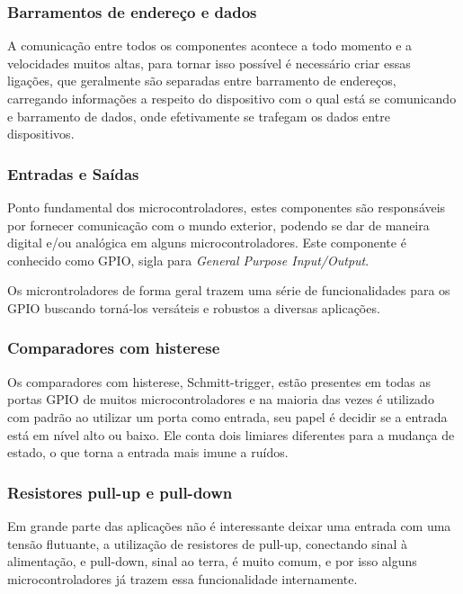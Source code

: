 \subsubsection*{Barramentos de endereço e dados}

A comunicação entre todos os componentes acontece a todo momento e a velocidades muitos altas, para tornar isso possível é necessário criar essas ligações, que geralmente são separadas entre barramento de endereços, carregando informações a respeito do dispositivo com o qual está se comunicando e barramento de dados, onde efetivamente se trafegam os dados entre dispositivos.

\subsubsection{Entradas e Saídas}

Ponto fundamental dos microcontroladores, estes componentes são responsáveis por fornecer comunicação com o mundo exterior, podendo se dar de maneira digital e/ou analógica em alguns microcontroladores. Este componente é conhecido como GPIO, sigla para \textit{General Purpose Input/Output}.

Os microntroladores de forma geral trazem uma série de funcionalidades \cite{Johnston2018} para os GPIO buscando torná-los versáteis e robustos a diversas aplicações.

\subsubsection*{Comparadores com histerese}

Os comparadores com histerese, Schmitt-trigger, estão presentes em todas as portas GPIO de muitos microcontroladores e na maioria das vezes é utilizado com padrão ao utilizar um porta como entrada, seu papel é decidir se a entrada está em nível alto ou baixo. Ele conta dois limiares diferentes para a mudança de estado, o que torna a entrada mais imune a ruídos.

\subsubsection*{Resistores pull-up e pull-down}

Em grande parte das aplicações não é interessante deixar uma entrada com uma tensão flutuante, a utilização de resistores de pull-up, conectando sinal à alimentação, e pull-down, sinal ao terra, é muito comum, e por isso alguns microcontroladores já trazem essa funcionalidade internamente.

